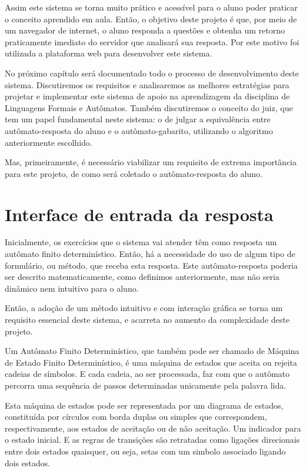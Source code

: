 \documentclass[
	12pt,				%
	openany,
	oneside,
	a4paper,			%
	english,			%
	brazil				%
	]{abntex2}
\begin{document}
  Assim este sistema se torna muito prático e acessível para o aluno poder praticar o conceito aprendido em aula. Então, o objetivo deste projeto é que, por meio de um navegador de internet, o aluno responda a questões e obtenha um retorno praticamente imediato do servidor que analisará sua resposta. Por este motivo foi utilizada a plataforma web para desenvolver este sistema.

  No próximo capítulo será documentado todo o processo de desenvolvimento deste sistema. Discutiremos os requisitos e analisaremos as melhores estratégias para projetar e implementar este sistema de apoio na aprendizagem da disciplina de Linguagens Formais e Autômatos. Também discutiremos o conceito do juiz, que tem um papel fundamental neste sistema: o de julgar a equivalência entre autômato-resposta do aluno e o autômato-gabarito, utilizando o algoritmo anteriormente escolhido.

  Mas, primeiramente, é necessário viabilizar um requisito de extrema importância para este projeto, de como será coletado o autômato-resposta do aluno.


\section{Interface de entrada da resposta}
  Inicialmente, os exercícios que o sistema vai atender têm como resposta um autômato finito determinístico. Então, há a necessidade do uso de algum tipo de formulário, ou método, que receba esta resposta. Este autômato-resposta poderia ser descrito matematicamente, como definimos anteriormente, mas não seria dinâmico nem intuitivo para o aluno.

    Então, a adoção de um método intuitivo e com interação gráfica se torna um requisito essencial deste sistema, e acarreta no aumento da complexidade deste projeto.

  Um Autômato Finito Determinístico, que também pode ser chamado de Máquina de Estado Finito Determinístico, é uma máquina de estados que aceita ou rejeita cadeias de símbolos. E cada cadeia, ao ser processada, faz com que o autômato percorra uma sequência de passos determinadas unicamente pela palavra lida.

  Esta máquina de estados pode ser representada por um diagrama de estados, constituída por círculos com borda duplas ou simples que correspondem, respectivamente, aos estados de aceitação ou de não aceitação. Um indicador para o estado inicial. E as regras de transições são retratadas como ligações direcionais entre dois estados quaisquer, ou seja, setas com um simbolo associado ligando dois estados.
\end{document}
